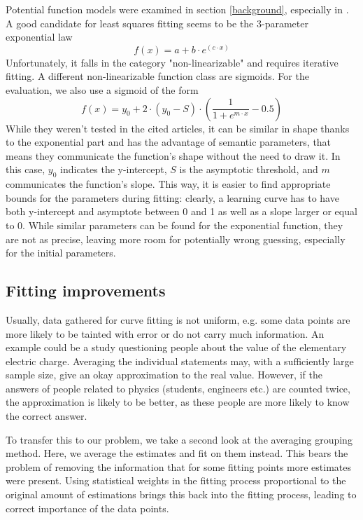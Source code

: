 Potential function models were examined in section \ref{background}, especially in \cite{Singh2005}. A good candidate for least squares fitting seems to be the 3-parameter exponential law
\begin{equation}
f(x) = a + b \cdot e^(c \cdot x)
\end{equation}
Unfortunately, it falls in the category "non-linearizable" and requires iterative fitting. A different non-linearizable function class are sigmoids. For the evaluation, we also use a sigmoid of the form
\begin{equation}
f(x) = y_0 + 2 \cdot (y_0 - S) \cdot \left( \frac{1}{1+e^{m \cdot x}} - 0.5 \right)
\end{equation}
While they weren't tested in the cited articles, it can be similar in shape thanks to the exponential part and has the advantage of semantic parameters, that means they communicate the function's shape without the need to draw it. In this case, $y_0$ indicates the y-intercept, $S$ is the asymptotic threshold, and $m$ communicates the function's slope. This way, it is easier to find appropriate bounds for the parameters during fitting: clearly, a learning curve has to have both y-intercept and asymptote between 0 and 1 as well as a slope larger or equal to 0. While similar parameters can be found for the exponential function, they are not as precise, leaving more room for potentially wrong guessing, especially for the initial parameters.

\subsection{Fitting improvements}
Usually, data gathered for curve fitting is not uniform, e.g. some data points are more likely to be tainted with error or do not carry much information. An example could be a study questioning people about the value of the elementary electric charge. Averaging the individual statements may, with a sufficiently large sample size, give an okay approximation to the real value. However, if the answers of people related to physics (students, engineers etc.) are counted twice, the approximation is likely to be better, as these people are more likely to know the correct answer.

To transfer this to our problem, we take a second look at the averaging grouping method. Here, we average the estimates and fit on them instead. This bears the problem of removing the information that for some fitting points more estimates were present. Using statistical weights in the fitting process proportional to the original amount of estimations brings this back into the fitting process, leading to correct importance of the data points.


